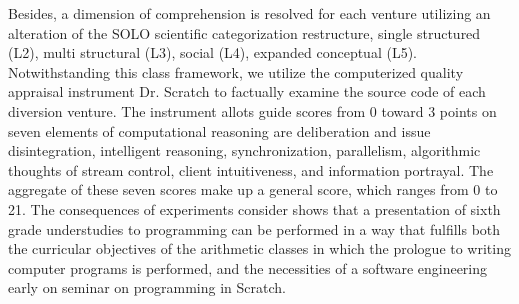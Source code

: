 Besides, a dimension of comprehension is resolved for each venture utilizing an alteration of the SOLO scientific categorization restructure, single structured (L2), multi structural (L3), social (L4), expanded conceptual (L5). Notwithstanding this class framework, we utilize the computerized quality appraisal instrument Dr. Scratch to factually examine the source code of each diversion venture. The instrument allots guide scores from 0 toward 3 points on seven elements of computational reasoning are deliberation and issue disintegration, intelligent reasoning, synchronization, parallelism, algorithmic thoughts of stream control, client intuitiveness, and information portrayal. The aggregate of these seven scores make up a general score, which ranges from 0 to 21. The consequences of experiments consider shows that a presentation of sixth grade understudies to programming can be performed in a way that fulfills both the curricular objectives of the arithmetic classes in which the prologue to writing computer programs is performed, and the necessities of a software engineering early on seminar on programming in Scratch.
